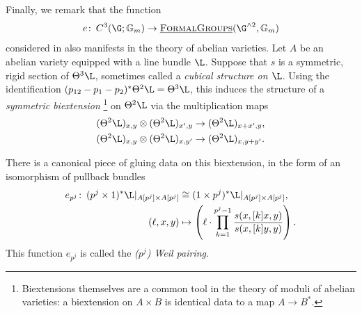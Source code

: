 Finally, we remark that the function \[e\co C^3(\G; \Gm) \to \InternalHom{FormalGroups}(\G^{\sm 2}, \Gm)\] considered in  also manifests in the theory of abelian varieties.
Let \(A\) be an abelian variety equipped with a line bundle \(\L\).
Suppose that \(s\) is a symmetric, rigid section of \(\Theta^3 \L\), sometimes called a \textit{cubical structure on \(\L\)}.
Using the identification \((p_{12} - p_1 - p_2)^* \Theta^2 \L = \Theta^3 \L\), this induces the structure of a \textit{symmetric biextension}%
\footnote{%
Biextensions themselves are a common tool in the theory of moduli of abelian varieties: a biextension on $A \times B$ is identical data to a map $A \to B^*$.
}
on \(\Theta^2 \L\) via the multiplication maps
\begin{align*}
(\Theta^2 \L)_{x, y} \otimes (\Theta^2 \L)_{x', y} & \to (\Theta^2 \L)_{x + x', y}, \\
(\Theta^2 \L)_{x, y} \otimes (\Theta^2 \L)_{x, y'} & \to (\Theta^2 \L)_{x, y + y'}.
\end{align*}

\begin{definition}
There is a canonical piece of gluing data on this biextension, in the form of an isomorphism of pullback bundles
\begin{align*}
e_{p^j}\co (p^j \times 1)^* \L|_{A[p^j] \times A[p^j]} & \cong (1 \times p^j)^* \L|_{A[p^j] \times A[p^j]}, \\
(\ell, x, y) & \mapsto \left(\ell \cdot \prod_{k=1}^{p^j-1} \frac{s(x, [k]x, y)}{s(x, [k]y, y)} \right).
\end{align*}
This function \(e_{p^j}\) is called the \textit{(\(p^j\)){\th} Weil pairing}.
\end{definition}

